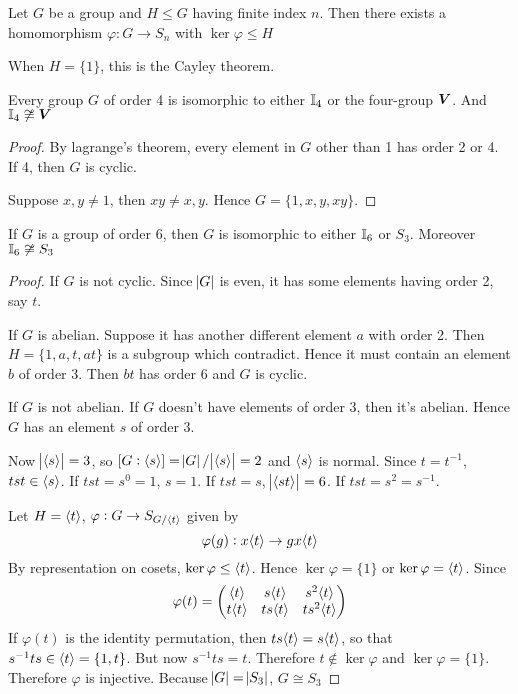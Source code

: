 \documentclass[11pt]{article}
\begin{document}
\begin{theorem}
Let \(G\) be a group and \(H\le G\) having finite index \(n\). Then there exists a
homomorphism \(\varphi:G\to S_n\) with \(\ker\varphi\le H\)
\end{theorem}

When \(H=\{1\}\), this is the Cayley theorem.

\begin{proposition}[]
Every group \(G\) of order 4 is isomorphic to either \(\mathbb{I}_4\) or the four-group
\(\boldsymbol{V}\). And \(\mathbb{I}_4\not\cong\boldsymbol{V}\)
\end{proposition}

\begin{proof}
By lagrange's theorem, every element in \(G\) other than 1 has order 2 or 4. If
4, then \(G\) is cyclic.

Suppose \(x,y\neq 1\), then \(xy\neq x,y\). Hence \(G=\{1,x,y,xy\}\).
\end{proof}


\begin{proposition}[]
If \(G\) is a group of order 6, then \(G\) is isomorphic to either \(\mathbb{I}_6\) or
\(S_3\). Moreover \(\mathbb{I}_6\not\cong S_3\)
\end{proposition}

\begin{proof}
If \(G\) is not cyclic. Since \(\abs{G}\) is even, it has some elements having
order 2, say \(t\).

If \(G\) is abelian. Suppose it has another different element \(a\) with order 2.
Then \(H=\{1,a,t,at\}\) is a subgroup which contradict. Hence it must contain
an element \(b\) of order 3. Then \(bt\) has order 6 and \(G\) is cyclic.

If \(G\) is not abelian. If \(G\) doesn't have elements of order 3, then it's
abelian. Hence \(G\) has an element \(s\) of order 3.

Now \(\abs{\langle s\rangle}=3\), so \([G:\langle s\rangle]=\abs{G}/\abs{\langle s\rangle}=2\) and \(\langle
   s\rangle\) is normal. Since \(t=t^{-1}\), \(tst\in\langle s\rangle\). If \(tst=s^0=1\), \(s=1\).
If \(tst=s\), \(\abs{\langle st\rangle}=6\). If \(tst=s^2=s^{-1}\).

Let \(H=\langle t\rangle\), \(\varphi:G\to S_{G/\langle t\rangle}\) given by
\begin{equation*}
\varphi(g):x\langle t\rangle\to gx\langle t\rangle
\end{equation*}
By representation on cosets, \(\operatorname{ker}\varphi\le\langle t\rangle\). Hence
\(\ker\varphi=\{1\}\) or \(\operatorname{ker}\varphi=\langle t\rangle\). Since
\begin{equation*}
\varphi(t)=
\begin{pmatrix}
\langle t\rangle&s\langle t\rangle&s^2\langle t\rangle\\
t\langle t\rangle&ts\langle t\rangle&ts^2\langle t \rangle
\end{pmatrix}
\end{equation*}
If \(\varphi(t)\) is the identity permutation, then \(ts\langle t\rangle=s\langle t\rangle\), so
that \(s^{-1}ts\in\langle t\rangle=\{1,t\}\). But now \(s^{-1}ts=t\). Therefore
\(t\not\in\ker\varphi\) and \(\ker\varphi=\{1\}\). Therefore \(\varphi\) is
injective. Because \(\abs{G}=\abs{S_3}\), \(G\cong S_3\)
\end{proof}
\end{document}
